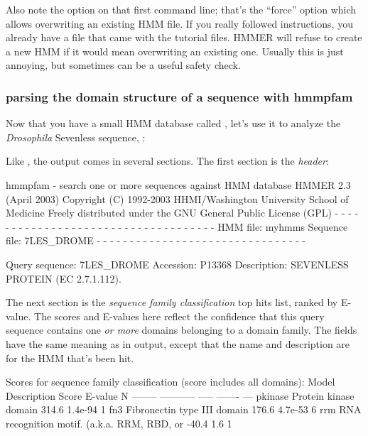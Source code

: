 Also note the  option on that first  command
line; that's the ``force'' option which allows overwriting an existing
HMM file. If you really followed instructions, you already have a file
 that came with the tutorial files. HMMER will refuse to
create a new HMM if it would mean overwriting an existing one. Usually
this is just annoying, but sometimes can be a useful safety check.

\subsubsection{parsing the domain structure of a sequence with hmmpfam}

Now that you have a small HMM database called , let's use
it to analyze the \emph{Drosophila} Sevenless sequence,
:


Like , the  output comes in several
sections. The first section is the \emph{ header}:

\begin{sreoutput}
hmmpfam - search one or more sequences against HMM database
HMMER 2.3 (April 2003)
Copyright (C) 1992-2003 HHMI/Washington University School of Medicine
Freely distributed under the GNU General Public License (GPL)
- - - - - - - - - - - - - - - - - - - - - - - - - - - - - - - - - - - -
HMM file:                 myhmms
Sequence file:            7LES_DROME
- - - - - - - - - - - - - - - - - - - - - - - - - - - - - - - -

Query sequence: 7LES_DROME
Accession:      P13368
Description:    SEVENLESS PROTEIN (EC 2.7.1.112).
\end{sreoutput}

The next section is the \emph{ sequence family classification} top hits
list, ranked by E-value. The scores and E-values here reflect the
confidence that this query sequence contains one \emph{or more} domains
belonging to a domain family. The fields have the same meaning as in
 output, except that the name and description are for
the HMM that's been hit.

\begin{sreoutput}
Scores for sequence family classification (score includes all domains):
Model    Description                                    Score    E-value  N 
-------- -----------                                    -----    ------- ---
pkinase  Protein kinase domain                          314.6    1.4e-94   1
fn3      Fibronectin type III domain                    176.6    4.7e-53   6
rrm      RNA recognition motif. (a.k.a. RRM, RBD, or    -40.4        1.6   1
\end{sreoutput}

